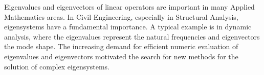 \begin{foreignabstract}

Eigenvalues and eigenvectors of linear operators are important in many Applied
Mathematics areas. In Civil Engineering, especially in Structural Analysis,
eigensystems have a fundamental importance. A typical example is in dynamic
analysis, where the eigenvalues represent the natural frequencies and
eigenvectors the mode shape. The increasing demand for efficient numeric
evaluation of eigenvalues and eigenvectors motivated the search for new methods
for the solution of complex eigensystems.

\end{foreignabstract}

